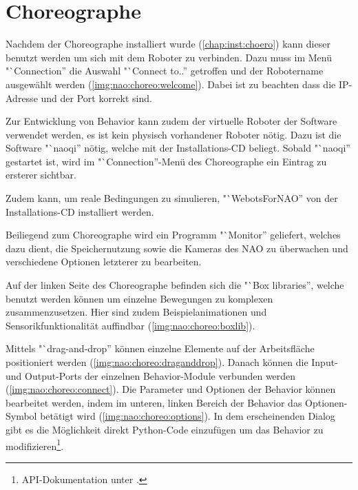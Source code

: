 \chapter{Choreographe}

    Nachdem der Choreographe installiert wurde (\ref{chap:inst:choero}) kann
    dieser benutzt werden um sich mit dem Roboter zu verbinden.
    Dazu muss im Menü "`Connection'' die Auswahl "`Connect to..'' getroffen
    und der Robotername ausgewählt werden (\autoref{img:nao:choreo:welcome}).
    Dabei ist zu beachten dass die \ac{IP}-Adresse und der Port korrekt sind.

    Zur Entwicklung von Behavior kann zudem der virtuelle Roboter der
    Software verwendet werden, es ist kein physisch vorhandener Roboter nötig.
    Dazu ist die Software "`naoqi'' nötig, welche mit der Installations-\ac{CD}
    beliegt.
    Sobald "`naoqi'' gestartet ist, wird im "`Connection''-Menü des Choreographe
    ein Eintrag zu ersterer sichtbar.

    Zudem kann, um reale Bedingungen zu simulieren, "`WebotsForNAO'' von der
    Installations-\ac{CD} installiert werden.

    Beiliegend zum Choreographe wird ein Programm "`Monitor'' geliefert, welches
    dazu dient, die Speichernutzung sowie die Kameras des NAO zu überwachen und
    verschiedene Optionen letzterer zu bearbeiten.


    Auf der linken Seite des Choreographe befinden sich die "`Box libraries'',
    welche benutzt werden können um einzelne Bewegungen zu komplexen
    zusammenzusetzen.
    Hier sind zudem Beispielanimationen und Sensorikfunktionalität auffindbar
    (\autoref{img:nao:choreo:boxlib}).

    Mittels "`drag-and-drop'' können einzelne Elemente auf der Arbeitsfläche
    positioniert werden (\autoref{img:nao:choreo:draganddrop}).
    Danach können die Input- und Output-Ports der einzelnen Behavior-Module
    verbunden werden (\autoref{img:nao:choreo:connect}).
    Die Parameter und Optionen der Behavior können bearbeitet werden, indem im
    unteren, linken Bereich der Behavior das Optionen-Symbol betätigt wird
    (\autoref{img:nao:choreo:options}).
    In dem erscheinenden Dialog gibt es die Möglichkeit direkt Python-Code
    einzufügen um das Behavior zu modifizieren\footnote{
        \ac{API}-Dokumentation unter \cite{nao:api}.
    }.


